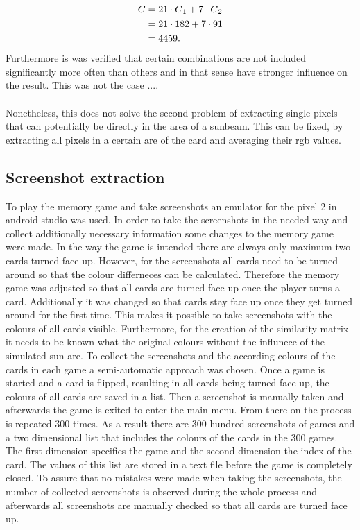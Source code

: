 \begin{align*}
C &= 21 \cdot C\textsubscript{1} + 7 \cdot C\textsubscript{2}\\
&= 21 \cdot 182 + 7 \cdot 91\\
&= 4459. 
\end{align*}
Furthermore is was verified that certain combinations are not included significantly more often than others and in that sense have stronger influence on the result. This was not the case .... \\\\
Nonetheless, this does not solve the second problem of extracting single pixels that can potentially be directly in the area of a sunbeam. This can be fixed, by extracting all pixels in a certain are of the card and averaging their rgb values. %

\subsection{Screenshot extraction}
To play the memory game and take screenshots an emulator for the pixel 2 in android studio was used. In order to take the screenshots in the needed way and collect additionally necessary information some changes to the memory game were made. In the way the game is intended there are always only maximum two cards turned face up. However, for the screenshots all cards need to be turned around so that the colour differneces can be calculated. Therefore the memory game was adjusted so that all cards are turned face up once the player turns a card. Additionally it was changed so that cards stay face up once they get turned around for the first time. This makes it possible to take screenshots with the colours of all cards visible. Furthermore, for the creation of the similarity matrix it needs to be known what the original colours without the influnece of the simulated sun are. To collect the screenshots and the according colours of the cards in each game a semi-automatic approach was chosen. Once a game is started and a card is flipped, resulting in all cards being turned face up, the colours of all cards are saved in a list. Then a screenshot is manually taken and afterwards the game is exited to enter the main menu. From there on the process is repeated 300 times. As a result there are 300 hundred screenshots of games and a two dimensional list that includes the colours of the cards in the 300 games. The first dimension specifies the game and the second dimension the index of the card. The values of this list are stored in a text file before the game is completely closed. To assure that no mistakes were made when taking the screenshots, the number of collected screenshots is observed during the whole process and afterwards all screenshots are manually checked so that all cards are turned face up.

